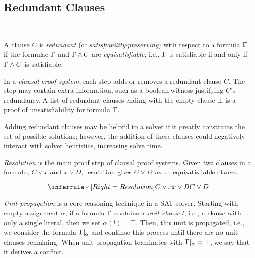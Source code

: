 \subsection{Redundant Clauses}~\label{subsec:redundant}

A clause $C$ is \emph{redundant} (or \emph{satisfiability-preserving}) with
respect to a formula $\Gamma$ if the formulae $\Gamma$ and $\Gamma \land
C$ are \emph{equisatisfiable}, i.e., $\Gamma$ is satisfiable if and only if
$\Gamma \land C$ is satisfiable.

In a \emph{clausal proof system}, each step adds or removes a redundant clause
$C$. The step may contain extra information, such as a boolean witness
justifying $C$'s redundancy. A list of redundant clauses ending with the empty
clause $\bot$ is a proof of unsatisfiability for formula $\Gamma$.


Adding redundant clauses may be helpful to a solver if it greatly constrains the
set of possible solutions; however, the addition of these clauses could
negatively interact with solver heuristics, increasing solve time.


\emph{Resolution} is the main proof step of clausal proof systems. Given two
clauses in a formula, $C \lor x$ and $\overline{x} \lor D$, resolution gives $C
\lor D$ as an equisatisfiable clause.

\begin{equation*}
    \inferrule*[Right=Resolution]{
        C \lor x \\ \overline{x} \lor D
    }{
        C \lor D
    }    
\end{equation*}

\emph{Unit propagation} is a core reasoning technique in a SAT solver. Starting
with empty assignment $\alpha$, if a formula $\Gamma$ contains a \emph{unit
clause} $l$, i.e., a clause with only a single literal, then we set $\alpha(l) =
\top$. Then, this unit is propagated, i.e., we consider the formula
$\Gamma|_\alpha$ and continue this process until there are no unit clauses
remaining. When unit propagation terminates with $\Gamma|_\alpha = \bot$, we
say that it derives a conflict.

